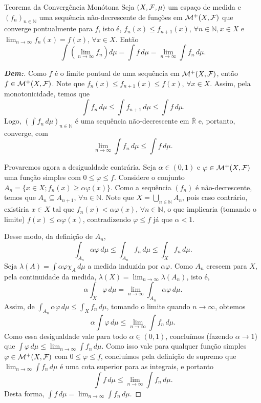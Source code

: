 \begin{theorem*}{Teorema da Convergência Monótona}
Seja $(X, \mathcal{F}, \mu)$ um espaço de medida e $(f_n)_{n \in \mathbb{N}}$ uma sequência não-decrescente de funções em $\mathcal{M}^+(X, \mathcal{F})$ que converge pontualmente para $f$, isto é, $f_n(x) \le f_{n+1}(x)$, $\forall n \in \mathbb{N}, x \in X$ e $\lim_{n \to \infty} f_n(x) = f(x)$, $\forall x \in X$. Então
$$ \int \left( \lim_{n \to \infty} f_n \right) d\mu = \int f \, d\mu = \lim_{n \to \infty} \int f_n \, d\mu. $$
\end{theorem*}

\begin{proof}[\textbf{Dem:}]
Como $f$ é o limite pontual de uma sequência em $\mathcal{M}^+(X, \mathcal{F})$, então $f \in \mathcal{M}^+(X, \mathcal{F})$. Note que $f_n(x) \le f_{n+1}(x) \le f(x)$, $\forall x \in X$. Assim, pela monotonicidade, temos que
$$ \int f_n \, d\mu \le \int f_{n+1} \, d\mu \le \int f \, d\mu. $$
Logo, $\left( \int f_n \, d\mu \right)_{n \in \mathbb{N}}$ é uma sequência não-decrescente em $\overline{\mathbb{R}}$ e, portanto, converge, com
$$ \lim_{n \to \infty} \int f_n \, d\mu \le \int f \, d\mu. $$

Provaremos agora a desigualdade contrária. Seja $\alpha \in (0,1)$ e $\varphi \in \mathcal{M}^+(X, \mathcal{F})$ uma função simples com $0 \le \varphi \le f$. Considere o conjunto $A_n = \{x \in X ; f_n(x) \ge \alpha \varphi(x)\}$.
Como a sequência $(f_n)$ é não-decrescente, temos que $A_n \subseteq A_{n+1}$, $\forall n \in \mathbb{N}$. Note que $X = \bigcup_{n \in \mathbb{N}} A_n$, pois caso contrário, existiria $x \in X$ tal que $f_n(x) < \alpha \varphi(x)$, $\forall n \in \mathbb{N}$, o que implicaria (tomando o limite) $f(x) \le \alpha \varphi(x)$, contradizendo $\varphi \le f$ já que $\alpha < 1$.

Desse modo, da definição de $A_n$,
$$ \int_{A_n} \alpha \varphi \, d\mu \le \int_{A_n} f_n \, d\mu \le \int_X f_n \, d\mu. $$
Seja $\lambda(A) = \int \alpha \varphi \chi_A \, d\mu$ a medida induzida por $\alpha\varphi$. Como $A_n$ crescem para $X$, pela continuidade da medida, $\lambda(X) = \lim_{n \to \infty} \lambda(A_n)$, isto é,
$$ \alpha \int_X \varphi \, d\mu = \lim_{n \to \infty} \int_{A_n} \alpha \varphi \, d\mu. $$
Assim, de $\int_{A_n} \alpha \varphi \, d\mu \le \int_X f_n \, d\mu$, tomando o limite quando $n \to \infty$, obtemos
$$ \alpha \int \varphi \, d\mu \le \lim_{n \to \infty} \int f_n \, d\mu. $$
Como essa desigualdade vale para todo $\alpha \in (0,1)$, concluímos (fazendo $\alpha \to 1$) que $\int \varphi \, d\mu \le \lim_{n \to \infty} \int f_n \, d\mu$.
Como isso vale para qualquer função simples $\varphi \in \mathcal{M}^+(X, \mathcal{F})$ com $0 \le \varphi \le f$, concluímos pela definição de supremo que $\lim_{n \to \infty} \int f_n \, d\mu$ é uma cota superior para as integrais, e portanto
$$ \int f \, d\mu \le \lim_{n \to \infty} \int f_n \, d\mu. $$
Desta forma, $\int f \, d\mu = \lim_{n \to \infty} \int f_n \, d\mu$.
\end{proof}
